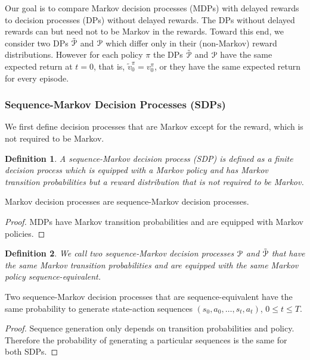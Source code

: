 \documentclass{article}
\newtheorem{definitionA}{Definition}
\renewcommand{\leq}{\leqslant}
\begin{document}
\begin{appendices}
Our goal is to compare Markov decision processes (MDPs)
with delayed rewards to decision processes (DPs) without delayed rewards.
The DPs without delayed rewards can but need not to be Markov in the rewards.
Toward this end, we consider two DPs $\tilde{\mathcal{P}}$ and $\mathcal{P}$ which
differ only in their (non-Markov) reward distributions. 
However for each policy $\pi$ the DPs $\tilde{\mathcal{P}}$ and $\mathcal{P}$
have the same expected return at $t=0$, 
that is, $\tilde{v}^{\pi}_0=v^{\pi}_0$, 
or they have the same expected return for every episode.

\subsubsection{Sequence-Markov Decision Processes (SDPs)}
\label{sec:Asdps}

We first define decision processes that
are Markov except for the reward, which is not required to be Markov.
\begin{definitionA}
  \label{def:Asdp}
A sequence-Markov decision process (SDP) is defined as a finite decision process which is equipped with 
a Markov policy and has Markov transition probabilities 
but a reward distribution that is not required to be Markov.
\end{definitionA}

\begin{propositionA}
\label{th:AsdpMDP}
  Markov decision processes are sequence-Markov decision processes.
\end{propositionA}
\begin{proof}
MDPs have Markov transition probabilities
and are equipped with Markov policies.
\end{proof}



\begin{definitionA}
  \label{def:AseqEqi}
We call two sequence-Markov decision processes $\mathcal{P}$ and $\tilde{\mathcal{P}}$  
that have the same Markov transition probabilities
and are equipped with the same Markov policy {\em sequence-equivalent}.
\end{definitionA}



\begin{lemmaA}
\label{th:AsdpSeq}
Two sequence-Markov decision processes that are 
sequence-equivalent have the same probability to generate 
state-action sequences $(s_0,a_0,\ldots,s_t,a_t)$, $0 \leq t \leq T$. 
\end{lemmaA}
\begin{proof}
Sequence generation only depends on transition probabilities
and policy. Therefore the probability of generating a particular
sequences is the same for both SDPs.
\end{proof}


\end{appendices}
\end{document}
